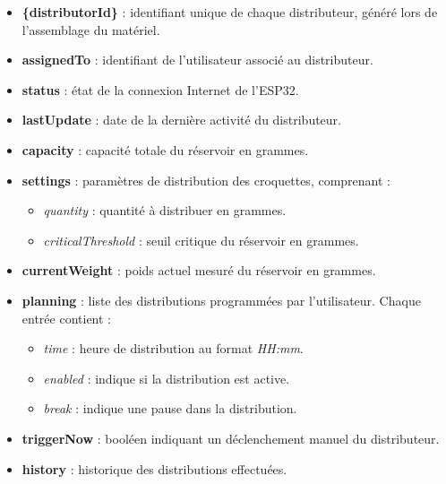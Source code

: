 \begin{enumerate}[label=\alph*)]
\begin{itemize}
\item \textbf{\{distributorId\}} : identifiant unique de chaque distributeur, généré lors de l'assemblage du matériel.
\item \textbf{assignedTo} : identifiant de l'utilisateur associé au distributeur.
\item \textbf{status} : état de la connexion Internet de l'ESP32.
\item \textbf{lastUpdate} : date de la dernière activité du distributeur.
\item \textbf{capacity} : capacité totale du réservoir en grammes.
\item \textbf{settings} : paramètres de distribution des croquettes, comprenant :
  \begin{itemize}
    \item \textit{quantity} : quantité à distribuer en grammes.
    \item \textit{criticalThreshold} : seuil critique du réservoir en grammes.
  \end{itemize}
\item \textbf{currentWeight} : poids actuel mesuré du réservoir en grammes.
\item \textbf{planning} : liste des distributions programmées par l'utilisateur. Chaque entrée contient :
  \begin{itemize}
    \item \textit{time} : heure de distribution au format \textit{HH:mm}.
    \item \textit{enabled} : indique si la distribution est active.
    \item \textit{break} : indique une pause dans la distribution.
  \end{itemize}
\item \textbf{triggerNow} : booléen indiquant un déclenchement manuel du distributeur.
\item \textbf{history} : historique des distributions effectuées.
\end{itemize}



\end{enumerate}


